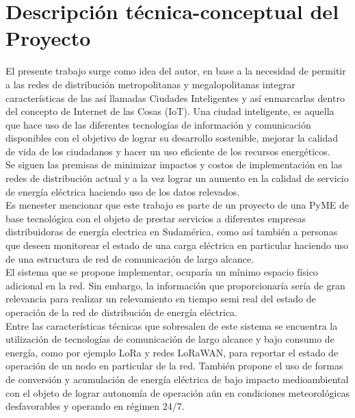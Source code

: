 \documentclass[11pt]{charter}
\begin{document}
\section{Descripción técnica-conceptual del Proyecto}
\label{sec:descripcion}

El presente trabajo surge como idea del autor, en base a la necesidad de permitir a las redes de distribución metropolitanas y megalopolitanas integrar características de las así llamadas Ciudades Inteligentes y así enmarcarlas dentro del concepto de Internet de las Cosas (IoT). Una ciudad inteligente, es aquella que hace uso de las diferentes tecnologías de información y comunicación disponibles con el objetivo de lograr su desarrollo sostenible, mejorar la calidad de vida de los ciudadanos y hacer un uso eficiente de los recursos energéticos.\\

Se siguen las premisas de minimizar impactos y costos de implementación en las redes de distribución actual y a la vez lograr un aumento en la calidad de servicio de energía eléctrica haciendo uso de los datos relevados.\\

Es menester mencionar que este trabajo es parte de un proyecto de una PyME de base tecnológica con el objeto de prestar servicios a diferentes empresas distribuidoras de energía electrica en Sudamérica, como así también a personas que deseen monitorear el estado de una carga eléctrica en particular haciendo uso de una estructura de red de comunicación de largo alcance.\\

El sistema que se propone implementar, ocuparía un mínimo espacio físico adicional en la red. Sin embargo, la información que proporcionaría sería de gran relevancia para realizar un relevamiento en tiempo semi real del estado de operación de la red de distribución de energía eléctrica.\\

Entre las características técnicas que sobresalen de este sistema se encuentra la utilización de tecnologías de comunicación de largo alcance y bajo consumo de energía, como por ejemplo LoRa y redes LoRaWAN, para reportar el estado de operación de un nodo en particular de la red. También propone el uso de formas de conversión y acumulación de energía eléctrica de bajo impacto medioambiental con el objeto de lograr autonomía de operación aún en condiciones meteorológicas desfavorables y operando en régimen 24/7.\\
\end{document}
